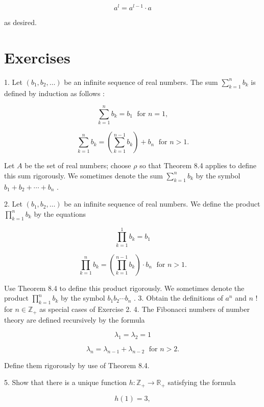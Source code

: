 \[
{a}^{l} = {a}^{l - 1} \cdot  a
\]

as desired.

\section*{Exercises}

1. Let \(\left( {{b}_{1},{b}_{2},\ldots }\right)\) be an infinite sequence of real numbers. The sum \(\mathop{\sum }\limits_{{k = 1}}^{n}{b}_{k}\) is defined by induction as follows :

\[
\mathop{\sum }\limits_{{k = 1}}^{n}{b}_{k} = {b}_{1}\;\text{ for }n = 1,
\]

\[
\mathop{\sum }\limits_{{k = 1}}^{n}{b}_{k} = \left( {\mathop{\sum }\limits_{{k = 1}}^{{n - 1}}{b}_{k}}\right)  + {b}_{n}\;\text{ for }n > 1.
\]

Let \(A\) be the set of real numbers; choose \(\rho\) so that Theorem 8.4 applies to define this sum rigorously. We sometimes denote the sum \(\mathop{\sum }\limits_{{k = 1}}^{n}{b}_{k}\) by the symbol \({b}_{1} + {b}_{2} + \cdots  + {b}_{n}\) .

2. Let \(\left( {{b}_{1},{b}_{2},\ldots }\right)\) be an infinite sequence of real numbers. We define the product \(\mathop{\prod }\limits_{{k = 1}}^{n}{b}_{k}\) by the equations

\[
\mathop{\prod }\limits_{{k = 1}}^{1}{b}_{k} = {b}_{1}
\]

\[
\mathop{\prod }\limits_{{k = 1}}^{n}{b}_{k} = \left( {\mathop{\prod }\limits_{{k = 1}}^{{n - 1}}{b}_{k}}\right)  \cdot  {b}_{n}\;\text{ for }n > 1.
\]

Use Theorem 8.4 to define this product rigorously. We sometimes denote the product \(\mathop{\prod }\limits_{{k = 1}}^{n}{b}_{k}\) by the symbol \({b}_{1}{b}_{2}\cdots {b}_{n}\) . 3. Obtain the definitions of \({a}^{n}\) and \(n\) ! for \(n \in  {\mathbb{Z}}_{ + }\) as special cases of Exercise 2. 4. The Fibonacci numbers of number theory are defined recursively by the formula

\[
{\lambda }_{1} = {\lambda }_{2} = 1
\]

\[
{\lambda }_{n} = {\lambda }_{n - 1} + {\lambda }_{n - 2}\;\text{ for }n > 2.
\]

Define them rigorously by use of Theorem 8.4.

5. Show that there is a unique function \(h : {\mathbb{Z}}_{ + } \rightarrow  {\mathbb{R}}_{ + }\) satisfying the formula

\[
h\left( 1\right)  = 3,
\]

